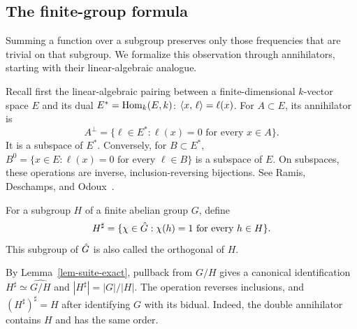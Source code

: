\subsection{The finite-group formula}
\label{abelian-finite-grpe-fish-formula}
\label{notation-34}\label{notation-35}\label{notation-36}

Summing a function over a subgroup preserves only those frequencies that are
trivial on that subgroup. We formalize this observation through
annihilators, starting with their linear-algebraic analogue.

Recall first the linear-algebraic pairing between a finite-dimensional
$k$-vector space $E$ and its dual $E^*=\operatorname{Hom}_k(E,k)$:
$\langle x,\,\ell\rangle=\ell(x)$. For $A\subset E$, its annihilator is
\begin{equation}
\label{eq-defn-orthogonal-ev}
 A^\perp=\{\ell\in E^*: \ell(x)=0\text{ for every }x\in A\}.
\end{equation}
It is a subspace of $E^*$. Conversely, for $B\subset E^*$,
$B^0=\{x\in E:\ell(x)=0\text{ for every }\ell\in B\}$ is a subspace of $E$.
On subspaces, these operations are inverse, inclusion-reversing bijections.
See Ramis, Deschamps, and Odoux~\cite{ramis-1}.


\begin{defn}
\label{defn-orthogonal-abelian-subgroup}\label{notation-37}
For a subgroup $H$ of a finite abelian group $G$, define
\[
 H^\sharp=\{\chi\in\hat{G}:\chi(h)=1\text{ for every }h\in H\}.
\]
This subgroup of $\hat{G}$ is also called the orthogonal of $H$.
\end{defn}
By Lemma~\ref{lem-suite-exact}, pullback from $G/H$ gives a canonical
identification $H^\sharp\simeq\widehat{G/H}$ and
$|H^\sharp|=|G|/|H|$. The operation reverses inclusions, and
$(H^\sharp)^\sharp=H$ after identifying $G$ with its bidual.
Indeed, the double annihilator contains $H$ and has the same order.


